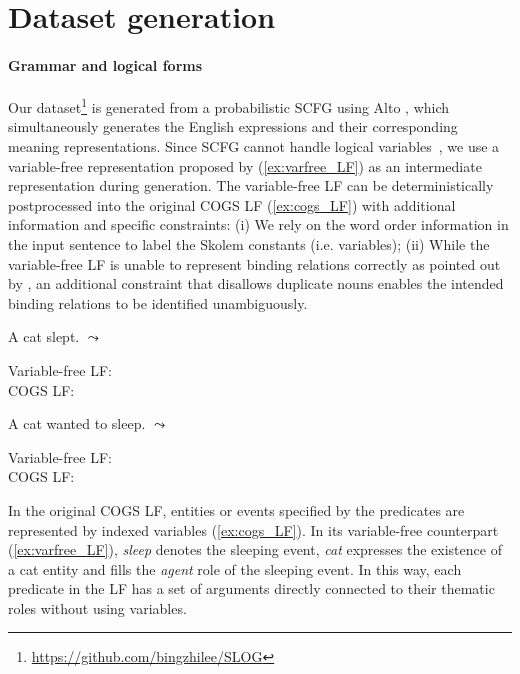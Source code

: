 \section{Dataset generation} \label{sec:data_generation}
\paragraph{Grammar and logical forms} 
Our dataset\footnote{\url{https://github.com/bingzhilee/SLOG}} is generated from a probabilistic \ac{SCFG} using Alto \citep{gontrum-etal-2017-alto}, which simultaneously generates the English expressions and their corresponding meaning representations. Since SCFG cannot handle logical variables~\citep{wong-mooney-2007-learning}, we use a variable-free representation proposed by \citet{qiu-etal-2022-improving} (\ref{ex:varfree_LF}) as an intermediate representation during generation. The variable-free LF can be deterministically postprocessed into the original COGS LF (\ref{ex:cogs_LF}) with additional information and specific constraints: (i) We rely on the word order information in the input sentence to label the Skolem constants (i.e. variables); (ii) While the variable-free LF is unable to represent binding relations correctly as pointed out by \citet{wu2023recogs}, an additional constraint that disallows duplicate nouns enables the intended binding relations to be identified unambiguously. 
\vspace{-0.5\baselineskip}
\begin{exe}
    \ex A cat slept. $\leadsto$
    \begin{xlist}
   \ex\label{ex:varfree_LF}
   Variable-free LF: \\  
   \ex\label{ex:cogs_LF} COGS LF:\\  
    \end{xlist}
    \ex A cat wanted to sleep. $\leadsto$ 
    
    \begin{xlist}
      \ex  \label{ex:varfree_LF_want} Variable-free LF: \\
    \ex \label{ex:cogs_LF_want} COGS LF:\\  
    {\fontsize{11.5}{12}\selectfont {}}
    \end{xlist} 
\end{exe}
\vspace{-0.5\baselineskip}
In the original COGS LF, entities or events specified by the predicates are represented by indexed variables (\ref{ex:cogs_LF}). In its variable-free counterpart (\ref{ex:varfree_LF}), \textit{sleep} denotes the sleeping event, \textit{cat} expresses the existence of a cat entity and fills the \textit{agent} role of the sleeping event. In this way, each predicate in the LF has a set of arguments directly connected to their thematic roles without using variables.

